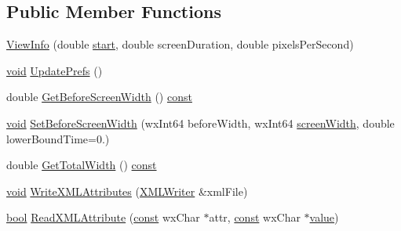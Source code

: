 \subsection*{Public Member Functions}
\begin{DoxyCompactItemize}
\item 
\hyperlink{class_view_info_a5fa89511993acfe2aed2343616426679}{View\+Info} (double \hyperlink{seqread_8c_ac503262ae470564980711da4f78b1181}{start}, double screen\+Duration, double pixels\+Per\+Second)
\item 
\hyperlink{sound_8c_ae35f5844602719cf66324f4de2a658b3}{void} \hyperlink{class_view_info_a836900fa1e645d7f271ebe7e612d2b2a}{Update\+Prefs} ()
\item 
double \hyperlink{class_view_info_afa9c56e63f959c3ebeadff2dd2f96e17}{Get\+Before\+Screen\+Width} () \hyperlink{getopt1_8c_a2c212835823e3c54a8ab6d95c652660e}{const} 
\item 
\hyperlink{sound_8c_ae35f5844602719cf66324f4de2a658b3}{void} \hyperlink{class_view_info_a4ea748322ee0ee9c986a4d1d2bb29243}{Set\+Before\+Screen\+Width} (wx\+Int64 before\+Width, wx\+Int64 \hyperlink{macint_8c_ae50cb92a78d9e0a4f4bd718fc02bd294}{screen\+Width}, double lower\+Bound\+Time=0.)
\item 
double \hyperlink{class_view_info_ac25f750fa0bb92fde44bf7d8e2938870}{Get\+Total\+Width} () \hyperlink{getopt1_8c_a2c212835823e3c54a8ab6d95c652660e}{const} 
\item 
\hyperlink{sound_8c_ae35f5844602719cf66324f4de2a658b3}{void} \hyperlink{class_view_info_a8564c304c04f4e4069fabeac274de998}{Write\+X\+M\+L\+Attributes} (\hyperlink{class_x_m_l_writer}{X\+M\+L\+Writer} \&xml\+File)
\item 
\hyperlink{mac_2config_2i386_2lib-src_2libsoxr_2soxr-config_8h_abb452686968e48b67397da5f97445f5b}{bool} \hyperlink{class_view_info_a9aefdda2621dd4694bf271b48eeeda27}{Read\+X\+M\+L\+Attribute} (\hyperlink{getopt1_8c_a2c212835823e3c54a8ab6d95c652660e}{const} wx\+Char $\ast$attr, \hyperlink{getopt1_8c_a2c212835823e3c54a8ab6d95c652660e}{const} wx\+Char $\ast$\hyperlink{lib_2expat_8h_a4a30a13b813682e68c5b689b45c65971}{value})
\end{DoxyCompactItemize}
